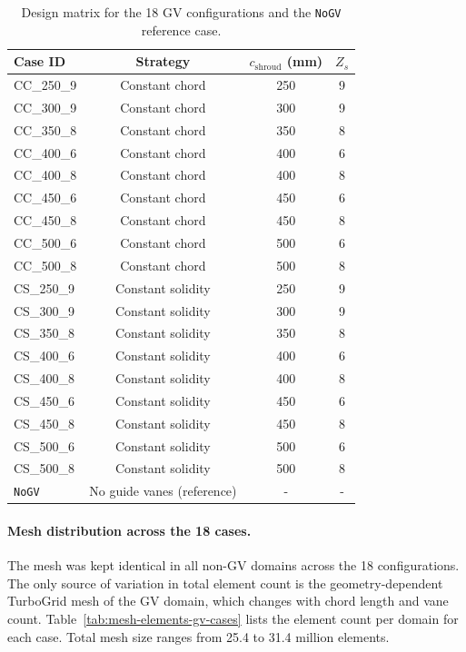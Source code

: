 \begin{table}[h!]
  \centering
  \caption[Design matrix]%
  {Design matrix for the 18 GV configurations and the \texttt{NoGV} reference case.}
  \label{tab:design_matrix}
  \small
  \begin{tabular}{l|c|c|c}
    \toprule
    \textbf{Case ID} & \textbf{Strategy} & $c_{\mathrm{shroud}}$ (mm) & $Z_s$ \\
    \midrule
    CC\_250\_9  & Constant chord    & 250 & 9 \\
    CC\_300\_9  & Constant chord    & 300 & 9 \\
    CC\_350\_8  & Constant chord    & 350 & 8 \\
    CC\_400\_6  & Constant chord    & 400 & 6 \\
    CC\_400\_8  & Constant chord    & 400 & 8 \\
    CC\_450\_6  & Constant chord    & 450 & 6 \\
    CC\_450\_8  & Constant chord    & 450 & 8 \\
    CC\_500\_6  & Constant chord    & 500 & 6 \\
    CC\_500\_8  & Constant chord    & 500 & 8 \\
    \midrule
    CS\_250\_9  & Constant solidity & 250 & 9 \\
    CS\_300\_9  & Constant solidity & 300 & 9 \\
    CS\_350\_8  & Constant solidity & 350 & 8 \\
    CS\_400\_6  & Constant solidity & 400 & 6 \\
    CS\_400\_8  & Constant solidity & 400 & 8 \\
    CS\_450\_6  & Constant solidity & 450 & 6 \\
    CS\_450\_8  & Constant solidity & 450 & 8 \\
    CS\_500\_6  & Constant solidity & 500 & 6 \\
    CS\_500\_8  & Constant solidity & 500 & 8 \\
    \midrule
    \texttt{NoGV} & No guide vanes (reference) & - & - \\
    \bottomrule
  \end{tabular}
\end{table}

\paragraph{Mesh distribution across the 18 cases.}
The mesh was kept identical in all non-GV domains across the 18 configurations. The only source of variation in total element count is the geometry-dependent TurboGrid mesh of the GV domain, which changes with chord length and vane count. Table~\ref{tab:mesh-elements-gv-cases} lists the element count per domain for each case. Total mesh size ranges from 25.4 to 31.4 million elements.

